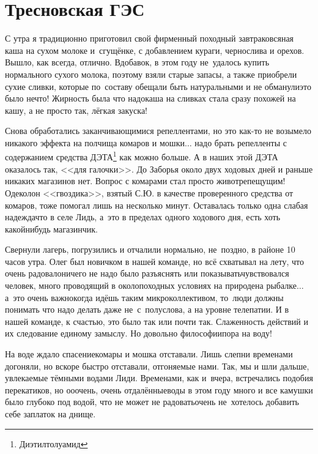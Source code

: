 \chapter{Тресновская ГЭС} 
\vepsianrose

С утра я традиционно приготовил свой фирменный походный завтрак\mdash овсяная каша на сухом молоке и~сгущёнке, с добавлением кураги, чернослива и орехов. Вышло, как всегда, отлично. Вдобавок, в этом году не~удалось купить нормального сухого молока, поэтому взяли старые запасы, а также приобрели сухие сливки, которые по~составу обещали быть натуральными и не обманули\mdash это было нечто! Жирность была что надо\mdash каша на сливках стала сразу похожей на кашу, а не просто так, лёгкая закуска! 

Снова обработались заканчивающимися репеллентами, но это как-то не возымело никакого эффекта на полчища комаров и мошки$\ldots$ надо брать репелленты с содержанием средства ДЭТА\footnote[1]{Диэтилтолуамид} как можно больше. А в наших этой ДЭТА оказалось так, <<для галочки>>. До Заборья около двух ходовых дней и раньше никаких магазинов нет. Вопрос с комарами стал просто животрепещущим! Одеколон <<гвоздика>>, взятый С.Ю. в качестве проверенного средства от комаров, тоже помогал лишь на несколько минут. Оставалась только одна слабая надежда\mdash что в селе Лидь, а~это в пределах одного ходового дня, есть хоть какой\sdash нибудь магазинчик.

Свернули лагерь, погрузились и отчалили нормально, не~поздно, в районе 10 часов утра. Олег был новичком в нашей команде, но всё схватывал на лету, что очень радовало\mdash ничего не надо было разъяснять или показывать\mdash чувствовался человек, много проводящий в околопоходных условиях на природе\mdash на рыбалке$\ldots$ а~это очень важно\mdash когда идёшь таким микроколлективом, то~люди должны понимать что надо делать даже не~с~полуслова, а на уровне телепатии. И в нашей команде, к счастью, это было так или почти так. Слаженность действий и их следование единому замыслу. Но довольно философии\mdash пора на воду!

На воде ждало спасение\mdash комары и мошка отставали. Лишь слепни временами догоняли, но вскоре быстро отставали, отгоняемые нами. Так, мы и шли дальше, увлекаемые тёмными водами Лиди. Временами, как и~вчера, встречались подобия перекатиков, но о\sdash о\sdash очень, очень отдалённые\mdash воды в этом году много и все камушки было глубоко под водой, что не может не радовать\mdash очень не~хотелось добавить себе заплаток на днище. 

